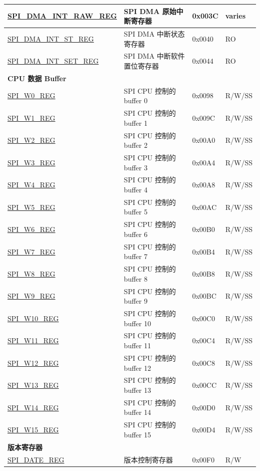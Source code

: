 \begin{longtable}{ | p{5.5cm} | p{7.2cm} | p{1.3cm} | p{1.5cm} | }
\hyperref[regdesc:SPIDMAINTRAWREG]{SPI\_DMA\_INT\_RAW\_REG} & SPI DMA 原始中断寄存器 & 0x003C & varies \\ \hline
\hyperref[regdesc:SPIDMAINTSTREG]{SPI\_DMA\_INT\_ST\_REG} & SPI DMA 中断状态寄存器 & 0x0040 & RO \\ \hline
\hyperref[regdesc:SPIDMAINTSETREG]{SPI\_DMA\_INT\_SET\_REG} & SPI DMA 中断软件置位寄存器 & 0x0044 & RO \\ \hline
\multicolumn{4}{|l|}{\textbf{CPU 数据 Buffer}} \\ \hline
\hyperref[regdesc:SPIW0REG]{SPI\_W0\_REG} & SPI CPU 控制的 buffer 0 & 0x0098 & R/W/SS \\ \hline
\hyperref[regdesc:SPIW1REG]{SPI\_W1\_REG} & SPI CPU 控制的 buffer 1 & 0x009C & R/W/SS \\ \hline
\hyperref[regdesc:SPIW2REG]{SPI\_W2\_REG} & SPI CPU 控制的 buffer 2 & 0x00A0 & R/W/SS \\ \hline
\hyperref[regdesc:SPIW3REG]{SPI\_W3\_REG} & SPI CPU 控制的 buffer 3 & 0x00A4 & R/W/SS \\ \hline
\hyperref[regdesc:SPIW4REG]{SPI\_W4\_REG} & SPI CPU 控制的 buffer 4 & 0x00A8 & R/W/SS \\ \hline
\hyperref[regdesc:SPIW5REG]{SPI\_W5\_REG} & SPI CPU 控制的 buffer 5 & 0x00AC & R/W/SS \\ \hline
\hyperref[regdesc:SPIW6REG]{SPI\_W6\_REG} & SPI CPU 控制的 buffer 6 & 0x00B0 & R/W/SS \\ \hline
\hyperref[regdesc:SPIW7REG]{SPI\_W7\_REG} & SPI CPU 控制的 buffer 7 & 0x00B4 & R/W/SS \\ \hline
\hyperref[regdesc:SPIW8REG]{SPI\_W8\_REG} & SPI CPU 控制的 buffer 8 & 0x00B8 & R/W/SS \\ \hline
\hyperref[regdesc:SPIW9REG]{SPI\_W9\_REG} & SPI CPU 控制的 buffer 9 & 0x00BC & R/W/SS \\ \hline
\hyperref[regdesc:SPIW10REG]{SPI\_W10\_REG} & SPI CPU 控制的 buffer 10 & 0x00C0 & R/W/SS \\ \hline
\hyperref[regdesc:SPIW11REG]{SPI\_W11\_REG} & SPI CPU 控制的 buffer 11 & 0x00C4 & R/W/SS \\ \hline
\hyperref[regdesc:SPIW12REG]{SPI\_W12\_REG} & SPI CPU 控制的 buffer 12 & 0x00C8 & R/W/SS \\ \hline
\hyperref[regdesc:SPIW13REG]{SPI\_W13\_REG} & SPI CPU 控制的 buffer 13 & 0x00CC & R/W/SS \\ \hline
\hyperref[regdesc:SPIW14REG]{SPI\_W14\_REG} & SPI CPU 控制的 buffer 14 & 0x00D0 & R/W/SS \\ \hline
\hyperref[regdesc:SPIW15REG]{SPI\_W15\_REG} & SPI CPU 控制的 buffer 15 & 0x00D4 & R/W/SS \\ \hline
\multicolumn{4}{|l|}{\textbf{版本寄存器}} \\ \hline
\hyperref[regdesc:SPIDATEREG]{SPI\_DATE\_REG} & 版本控制寄存器 & 0x00F0 & R/W \\ \hline
\end{longtable}
